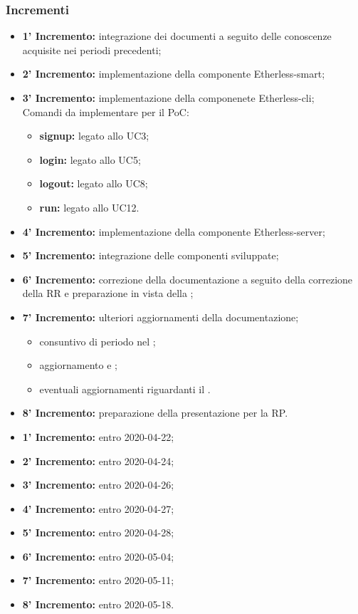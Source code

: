 	\subsubsection{Incrementi}
			\begin{itemize}
				\item \textbf{1' Incremento:} integrazione dei documenti a seguito delle conoscenze acquisite nei periodi precedenti;
				\item \textbf{2' Incremento:} implementazione della componente Etherless-smart;
				\item \textbf{3' Incremento:} implementazione della componenete Etherless-cli; \\
				Comandi da implementare per il PoC:
					\begin{itemize}
						\item \textbf{signup:} legato allo UC3;
						\item \textbf{login:} legato allo UC5;
						\item \textbf{logout:} legato allo UC8;
						\item \textbf{run:} legato allo UC12.
					\end{itemize}
				\item \textbf{4' Incremento:} implementazione della componente Etherless-server;
				\item \textbf{5' Incremento:} integrazione delle componenti sviluppate;
				\item \textbf{6' Incremento:} correzione della documentazione a seguito della correzione della RR e preparazione in vista della \TB{};
				\item \textbf{7' Incremento:} ulteriori aggiornamenti della documentazione;
				\begin{itemize}
					\item consuntivo di periodo nel \PdP{};
					\item aggiornamento \NdP{} e \PdQ{};
					\item eventuali aggiornamenti riguardanti il \Glossario{}.
				\end{itemize}
				\item \textbf{8' Incremento:} preparazione della presentazione per la RP.
			\end{itemize}
			\begin{itemize}
				\item \textbf{1' Incremento:} entro 2020-04-22;
				\item \textbf{2' Incremento:} entro 2020-04-24;
				\item \textbf{3' Incremento:} entro 2020-04-26;
				\item \textbf{4' Incremento:} entro 2020-04-27;
				\item \textbf{5' Incremento:} entro 2020-04-28; %
				\item \textbf{6' Incremento:} entro 2020-05-04;
				\item \textbf{7' Incremento:} entro 2020-05-11;
				\item \textbf{8' Incremento:} entro 2020-05-18.
			\end{itemize}


